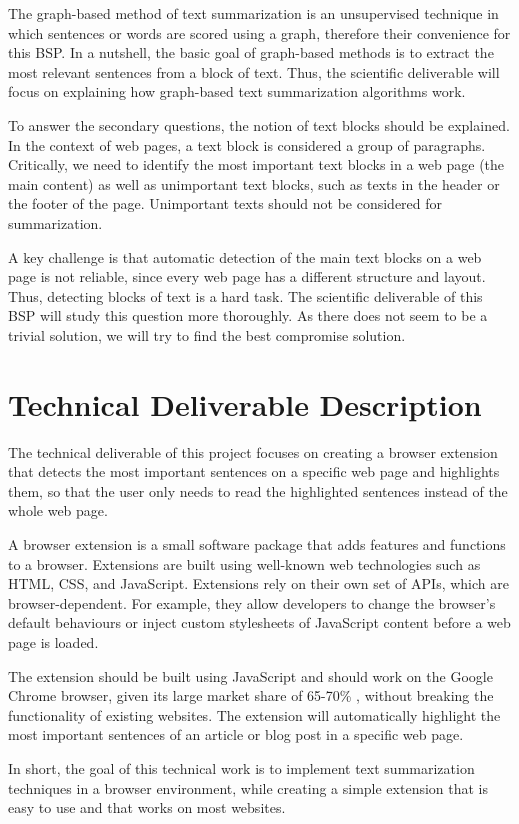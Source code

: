 \documentclass[conference,compsoc]{IEEEtran}
\begin{document}
The graph-based method of text summarization is an unsupervised technique in which sentences or words are scored using a graph, therefore their convenience for this BSP. In a nutshell, the basic goal of graph-based methods is to extract the most relevant sentences from a block of text. Thus, the scientific deliverable will focus on explaining how graph-based text summarization algorithms work.

To answer the secondary questions, the notion of text blocks should be explained. In the context of web pages, a text block is considered a group of paragraphs. Critically, we need to identify the most important text blocks in a web page (the main content) as well as unimportant text blocks, such as texts in the header or the footer of the page. Unimportant texts should not be considered for summarization.

A key challenge is that automatic detection of the main text blocks on a web page is not reliable, since every web page has a different structure and layout. Thus, detecting blocks of text is a hard task. The scientific deliverable of this BSP will study this question more thoroughly. As there does not seem to be a trivial solution, we will try to find the best compromise solution.


\section{Technical Deliverable Description}

The technical deliverable of this project focuses on creating a browser extension that detects the most important sentences on a specific web page and highlights them, so that the user only needs to read the highlighted sentences instead of the whole web page.

A browser extension is a small software package that adds features and functions to a browser. Extensions are built using well-known web technologies such as HTML, CSS, and JavaScript. Extensions rely on their own set of APIs, which are browser-dependent. For example, they allow developers to change the browser's default behaviours or inject custom stylesheets of JavaScript content before a web page is loaded.

The extension should be built using JavaScript and should work on the Google Chrome browser, given its large market share of 65-70\% \cite{netmarketshare} \cite{statcounter}, without breaking the functionality of existing websites. The extension will automatically highlight the most important sentences of an article or blog post in a specific web page.

In short, the goal of this technical work is to implement text summarization techniques in a browser environment, while creating a simple extension that is easy to use and that works on most websites.

\newpage

\nocite{bics-bsp-reference-document}
\nocite{bics-bsp-report-template}



\end{document}
